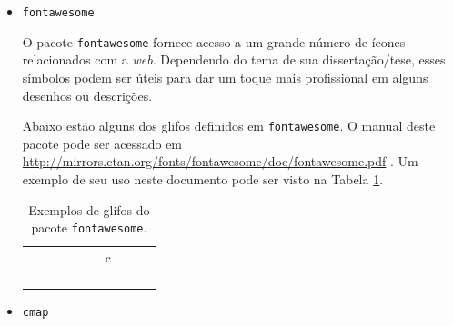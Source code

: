\begin{itemize}
\item \texttt{fontawesome}

O pacote \texttt{fontawesome} fornece acesso a um grande número de ícones relacionados com a \textit{web}. Dependendo do tema de sua dissertação/tese, esses símbolos podem ser úteis para dar um toque mais profissional em alguns desenhos ou descrições.



Abaixo estão alguns dos glifos definidos em \texttt{fontawesome}. O manual deste pacote pode ser acessado em 
\url{http://mirrors.ctan.org/fonts/fontawesome/doc/fontawesome.pdf} \parencite{fontawesome}. Um exemplo de seu uso neste documento pode ser visto na Tabela \ref{tab:fontawesome}.

\begin{table}[htb]
	\begin{center}
	\begin{tabular}{|c|c|c|c|c|c|c|c|c|c|}
		\hline
		\faBattery[0] & \faBattery[1] & \faBattery[2] & \faBattery[3] & \faBattery[4] & \faBarChart & \faBarcode & \faBluetooth & \faBeer & \faCalculator \\ \hline \faCalendar & \faClockO & \faClone & \faCloudDownload & \faCloudDownload & \faCodeFork &c\faCopy & \faCopyright & \faCreativeCommons & \faHotel \\ \hline
		\faFolder & \faFolderOpen & \faFolderO & \faFolderOpenO & \faGears & \faDesktop & \faLaptop & \faMobile & \faFile & \faFilePdfO \\ \hline 
		\faFilePhotoO & \faFilePowerpointO & \faFileSoundO & \faFileSoundO & \faFileTextO & \faFileVideoO & \faFileWordO & \faFileZipO & \faFilm & \faRebel \\ \hline
		\faAndroid & \faGoogle & \faAmazon & \faOpera & \faGithub & \faGitlab & \faFacebook & \faChrome & \faInstagram & \faInternetExplorer  \\ \hline 
		\faJoomla &	\faLinux & \faApple & \faSafari & \faSkype &  \faSnapchat & \faSpotify & \faTwitter & \faWikipediaW & \faWindows \\ \hline
	\end{tabular}
    \end{center}
    \caption{Exemplos de glifos do pacote \texttt{fontawesome}.}
    \label{tab:fontawesome}
\end{table}

\item \texttt{cmap}


\end{itemize}
